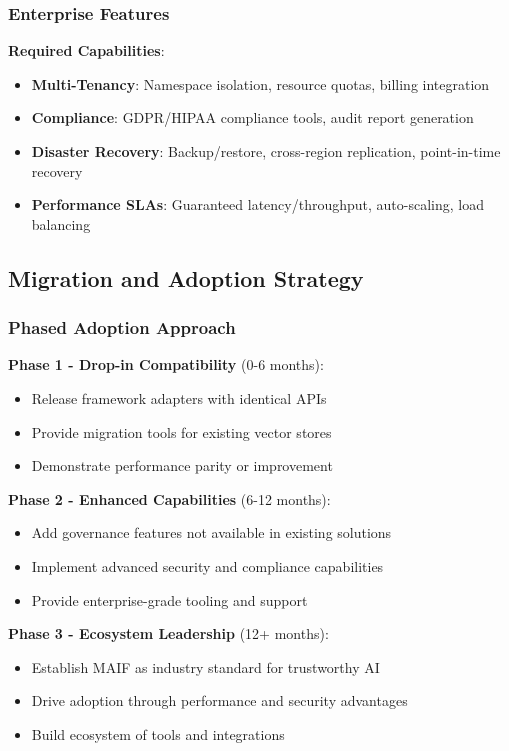 \documentclass[conference]{IEEEtran}
\begin{document}
\subsubsection{Enterprise Features}

\textbf{Required Capabilities}:
\begin{itemize}[leftmargin=*]
\item \textbf{Multi-Tenancy}: Namespace isolation, resource quotas, billing integration
\item \textbf{Compliance}: GDPR/HIPAA compliance tools, audit report generation
\item \textbf{Disaster Recovery}: Backup/restore, cross-region replication, point-in-time recovery
\item \textbf{Performance SLAs}: Guaranteed latency/throughput, auto-scaling, load balancing
\end{itemize}

\subsection{Migration and Adoption Strategy}

\subsubsection{Phased Adoption Approach}

\textbf{Phase 1 - Drop-in Compatibility} (0-6 months):
\begin{itemize}[leftmargin=*]
\item Release framework adapters with identical APIs
\item Provide migration tools for existing vector stores
\item Demonstrate performance parity or improvement
\end{itemize}

\textbf{Phase 2 - Enhanced Capabilities} (6-12 months):
\begin{itemize}[leftmargin=*]
\item Add governance features not available in existing solutions
\item Implement advanced security and compliance capabilities
\item Provide enterprise-grade tooling and support
\end{itemize}

\textbf{Phase 3 - Ecosystem Leadership} (12+ months):
\begin{itemize}[leftmargin=*]
\item Establish MAIF as industry standard for trustworthy AI
\item Drive adoption through performance and security advantages
\item Build ecosystem of tools and integrations
\end{itemize}
\end{document}
